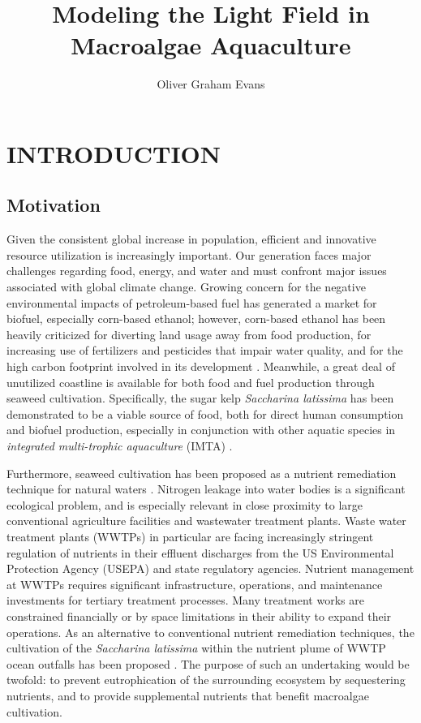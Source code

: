 \documentclass[ms,cpyr,lof,lot]{uathesis}
\title{Modeling the Light Field in Macroalgae Aquaculture}
\author{Oliver Graham Evans}
\providecommand{\DIFaddbegin}{} %
\providecommand{\DIFaddend}{} %
\providecommand{\DIFdelbegin}{} %
\providecommand{\DIFdelend}{} %
\newcommand{\DIFscaledelfig}{0.5}
\newlength{\DIFdelgraphicswidth} %
\newlength{\DIFdelgraphicsheight} %
\newcommand{\DIFaddincludegraphics}[2][]{{\color{blue}\fbox{\DIFOincludegraphics[#1]{#2}}}} %
\newcommand{\DIFdelincludegraphics}[2][]{%
\sbox{\DIFdelgraphicsbox}{\DIFOincludegraphics[#1]{#2}}%
\settoboxwidth{\DIFdelgraphicswidth}{\DIFdelgraphicsbox} %
\settoboxtotalheight{\DIFdelgraphicsheight}{\DIFdelgraphicsbox} %
\scalebox{\DIFscaledelfig}{%
\parbox[b]{\DIFdelgraphicswidth}{\usebox{\DIFdelgraphicsbox}\\[-\baselineskip] \rule{\DIFdelgraphicswidth}{0em}}\llap{\resizebox{\DIFdelgraphicswidth}{\DIFdelgraphicsheight}{%
\setlength{\unitlength}{\DIFdelgraphicswidth}%
\begin{picture}(1,1)%
\thicklines\linethickness{2pt} %
{\color[rgb]{1,0,0}\put(0,0){\framebox(1,1){}}}%
{\color[rgb]{1,0,0}\put(0,0){\line( 1,1){1}}}%
{\color[rgb]{1,0,0}\put(0,1){\line(1,-1){1}}}%
\end{picture}%
}\hspace*{3pt}}} %
} %
\DeclareRobustCommand{\DIFaddbegin}{\DIFOaddbegin \let\includegraphics\DIFaddincludegraphics} %
\DeclareRobustCommand{\DIFaddend}{\DIFOaddend \let\includegraphics\DIFOincludegraphics} %
\DeclareRobustCommand{\DIFdelbegin}{\DIFOdelbegin \let\includegraphics\DIFdelincludegraphics} %
\DeclareRobustCommand{\DIFdelend}{\DIFOaddend \let\includegraphics\DIFOincludegraphics} %
\begin{document}
\maketitle
\chapter{INTRODUCTION} \DIFdelbegin %
\DIFdelend \DIFaddbegin \label{chap:introduction}
\DIFaddend 

\section{Motivation}
  Given the consistent global increase in population, efficient and innovative resource utilization is increasingly important.
Our generation faces major challenges regarding food, energy, and water and must confront major issues associated with global climate change.
Growing concern for the negative environmental impacts of petroleum-based fuel has generated a market for biofuel, especially corn-based ethanol;
however, corn-based ethanol has been heavily criticized for diverting land usage away from food production, for increasing use of fertilizers and pesticides that impair water quality, and for the high carbon footprint involved in its development \cite{jones_corn-based_2015}.
Meanwhile, a great deal of unutilized coastline is available for both food and fuel production through seaweed cultivation.
Specifically, the sugar kelp \textit{Saccharina latissima} has been demonstrated to be a viable source of food, both for direct human consumption and biofuel production, especially in conjunction with other aquatic species in \textit{integrated multi-trophic aquaculture} (IMTA) \cite{brzeski_integrated_1996,chopin_integrating_2001,hadley_modeling_2015,handa_seasonal_2013}.

Furthermore, seaweed cultivation has been proposed as a nutrient remediation technique for natural waters \cite{kim_field_2014}.
Nitrogen leakage into water bodies is a significant ecological problem, and is especially relevant in close proximity to large conventional agriculture facilities and wastewater treatment plants.
Waste water treatment plants (WWTPs) in particular are facing increasingly stringent regulation of nutrients in their effluent discharges from the US Environmental Protection Agency (USEPA) and state regulatory agencies.
Nutrient management at WWTPs requires significant infrastructure, operations, and maintenance investments for tertiary treatment processes. Many treatment works are constrained financially or by space limitations in their ability to expand their operations.
As an alternative to conventional nutrient remediation techniques, the cultivation of the \textit{Saccharina latissima} within the nutrient plume of WWTP ocean outfalls has been proposed \cite{yang_kelp_2015}.
The purpose of such an undertaking would be twofold: to prevent eutrophication of the surrounding ecosystem by sequestering nutrients, and to provide supplemental nutrients that benefit macroalgae cultivation.
\end{document}
